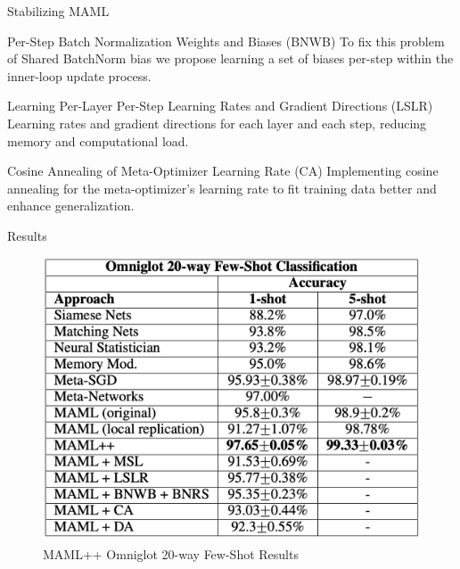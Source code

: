 \documentclass{beamer}
\begin{document}
\begin{frame}{Stabilizing MAML}
    \begin{block}{Per-Step Batch Normalization Weights and Biases (BNWB)}
        To fix this problem of Shared BatchNorm bias we propose learning a set of biases per-step within the inner-loop update process.
    \end{block}
    \begin{block}{Learning Per-Layer Per-Step Learning Rates and Gradient Directions (LSLR)}
        Learning rates and gradient directions for each layer and each step, reducing memory and computational load.
    \end{block}
    \begin{block}{Cosine Annealing of Meta-Optimizer Learning Rate (CA)}
        Implementing cosine annealing for the meta-optimizer's learning rate to fit training data better and enhance generalization.
    \end{block}
\end{frame}

\begin{frame}{Results}
    \begin{figure}{}
        \centering
        \includegraphics[scale=0.32]{images/table1.png}
        \caption{MAML++ Omniglot 20-way Few-Shot Results}
        \label{fig:enter-label}
    \end{figure}
\end{frame}
\end{document}
